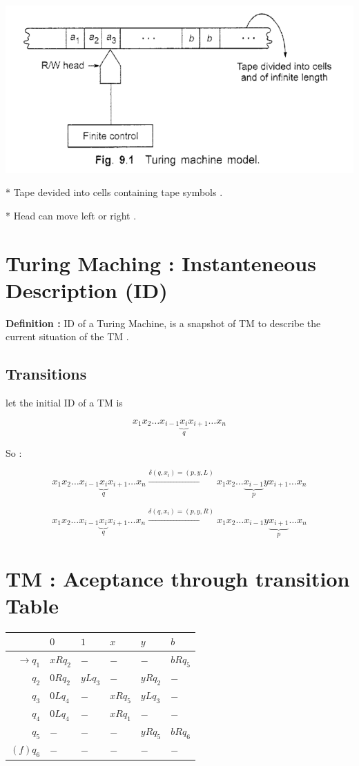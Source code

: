 \documentclass[12pt]{book}
\begin{document}
\begin{center}
	\includegraphics[scale=.7]{./turing.png}
\end{center}

* Tape devided into cells containing tape symbols .

* Head can move left or right .



\section{Turing Maching : Instanteneous Description (ID)}
\textbf{Definition : } ID of a Turing Machine, is a snapshot of TM to describe the current situation of the TM .

\subsection{Transitions}

let the initial ID of a TM is 

$$
x_{1} x_{2} \dots x_{i-1} \underbrace{x_{i}}_{q} x_{i+1} \dots x_{n}
$$

So :

$$
x_{1} x_{2} \dots x_{i-1} \underbrace{x_{i}}_{q} x_{i+1} \dots x_{n} \xrightarrow{\delta(q,x_{i}) = (p,y,L)}  x_{1} x_{2} \dots \underbrace{x_{i-1}}_{p} y x_{i+1} \dots x_{n}
$$


$$
x_{1} x_{2} \dots x_{i-1} \underbrace{x_{i}}_{q} x_{i+1} \dots x_{n} \xrightarrow{\delta(q,x_{i}) = (p,y,R)}  x_{1} x_{2} \dots  x_{i-1} y \underbrace{x_{i+1}}_{p} \dots x_{n}
$$


\section{TM : Aceptance through transition Table}


\begin{tabular}{ r | l l l l l  } 
     & $0$ & $1$ & $x$ & $y$ & $b$  \\
\hline
$\to q_{1}$ & $xRq_{2}$ & $-$ & $-$ &$-$ & $bRq_{5}$\\
$q_{2}$ & $0Rq_{2}$ & $yLq_{3}$ & $-$ & $yRq_{2}$ & $-$ \\
$q_{3}$ & $0Lq_{4}$ & $-$ & $xRq_{5}$ & $yLq_{3}$ & $-$  \\
$q_{4}$ & $0Lq_{4}$ & $-$ & $xRq_{1}$ & $-$ & $-$   \\
$q_{5}$ & $-$ & $-$ & $-$ & $yRq_{5}$ & $bRq_{6}$   \\
$(f) q_{6}$ & $-$ & $-$ & $-$ & $-$ & $-$   \\
\end{tabular}
\end{document}
